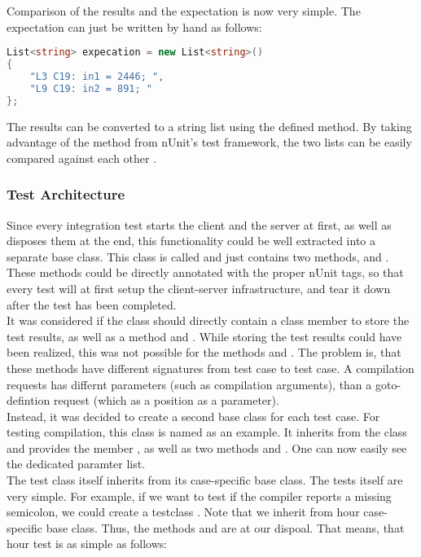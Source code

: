 Comparison of the results and the expectation is now very simple.
The expectation can just be written by hand as follows:

\begin{lstlisting}[language=csharp, caption={Expectation}, captionpos=b, label={lst:testexpectation}]
List<string> expecation = new List<string>()
{
    "L3 C19: in1 = 2446; ",
    "L9 C19: in2 = 891; "
};
\end{lstlisting}

The results can be converted to a string list using the defined  method.
By taking advantage of the method  from nUnit's test framework, the two lists can be easily compared against each other \cite{nunitCollectionAssert}.

\subsubsection{Test Architecture}
Since every integration test starts the client and the server at first, as well as disposes them at the end, this functionality could be well extracted into a separate base class.
This class is called  and just contains two methods,  and .
These methods could be directly annotated with the proper nUnit tags, so that every test will at first setup the client-server infrastructure, and tear it down after the test has been completed.\\
It was considered if the  class should directly contain a class member\linebreak {} to store the test results, as well as a method  and . While storing the test results could have been realized, this was not possible for the methods  and . The problem is, that these methods have different signatures from test case to test case. A compilation requests has differnt parameters (such as compilation arguments), than a goto-defintion request (which as a position as a parameter).\\
Instead, it was decided to create a second base class for each test case.
For testing compilation, this class is named  as an example.
It inherits from the  class and provides the member , as well as two methods  and . One can now easily see the dedicated paramter list.\\
The test class itself inherits from its case-specific base class.
The tests itself are very simple.
For example, if we want to test if the compiler reports a missing semicolon, we could create a testclass .
Note that we inherit from hour case-specific base class.
Thus, the methods  and are at our dispoal.
That means, that hour test is as simple as follows:

